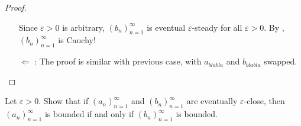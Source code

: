 \begin{proof}
\begin{itemize}
        Since \(\varepsilon > 0\) is arbitrary, \((b_n)_{n = 1}^{\infty}\) is eventual \(\varepsilon\)-steady for all \(\varepsilon > 0\).
        By , \((b_n)_{n = 1}^{\infty}\) is Cauchy!
    \item[\(\Longleftarrow\)]:
        The proof is similar with previous case, with \(a_{blabla}\) and \(b_{blabla}\) swapped.
\end{itemize}
\end{proof}

\begin{exercise} \label{exercise 5.2.2}
Let \(\varepsilon > 0\).
Show that if \((a_n)_{n = 1}^{\infty}\) and \((b_n)_{n = 1}^{\infty}\) are eventually \(\varepsilon\)-close,
then \((a_n)_{n = 1}^{\infty}\) is bounded if and only if \((b_n)_{n = 1}^{\infty}\) is bounded.
\end{exercise}
